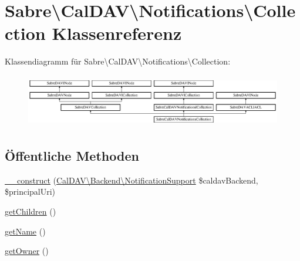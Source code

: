 \hypertarget{class_sabre_1_1_cal_d_a_v_1_1_notifications_1_1_collection}{}\section{Sabre\textbackslash{}Cal\+D\+AV\textbackslash{}Notifications\textbackslash{}Collection Klassenreferenz}
\label{class_sabre_1_1_cal_d_a_v_1_1_notifications_1_1_collection}
Klassendiagramm für Sabre\textbackslash{}Cal\+D\+AV\textbackslash{}Notifications\textbackslash{}Collection\+:\begin{figure}[H]
\begin{center}
\leavevmode
\includegraphics[height=2.333333cm]{class_sabre_1_1_cal_d_a_v_1_1_notifications_1_1_collection}
\end{center}
\end{figure}
\subsection*{Öffentliche Methoden}
\begin{DoxyCompactItemize}
\item 
\mbox{\hyperlink{class_sabre_1_1_cal_d_a_v_1_1_notifications_1_1_collection_a8bf6d75629c075e08230aeffee783aff}{\+\_\+\+\_\+construct}} (\mbox{\hyperlink{interface_sabre_1_1_cal_d_a_v_1_1_backend_1_1_notification_support}{Cal\+D\+A\+V\textbackslash{}\+Backend\textbackslash{}\+Notification\+Support}} \$caldav\+Backend, \$principal\+Uri)
\item 
\mbox{\hyperlink{class_sabre_1_1_cal_d_a_v_1_1_notifications_1_1_collection_ad32780b546f2afcf90bd761741735831}{get\+Children}} ()
\item 
\mbox{\hyperlink{class_sabre_1_1_cal_d_a_v_1_1_notifications_1_1_collection_a611b7fd53e6e29320c1a627bc964da3e}{get\+Name}} ()
\item 
\mbox{\hyperlink{class_sabre_1_1_cal_d_a_v_1_1_notifications_1_1_collection_a2da08679114fa20070147096aacfca72}{get\+Owner}} ()
\end{DoxyCompactItemize}

